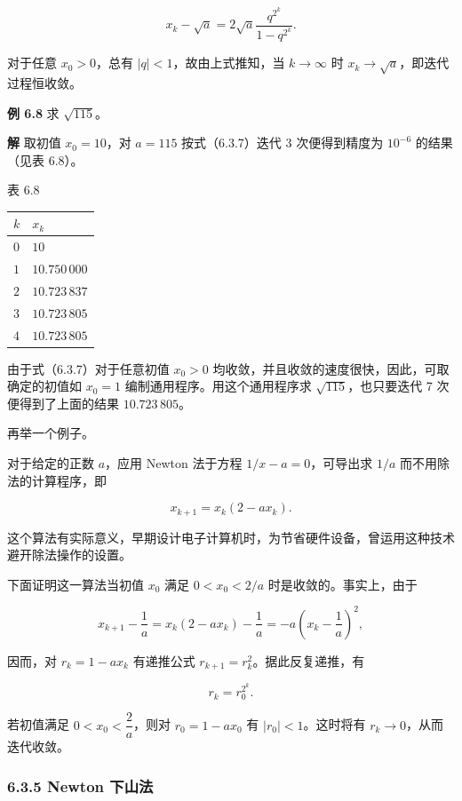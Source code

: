\documentclass[
  10pt,
  fontset=fandol]{ctexart}
\newcounter{none} %
\begin{document}
\[
x_k-\sqrt{a}=2\sqrt{a}\frac{q^{2^k}}{1-q^{2^k}}.
\]

对于任意 \(x_0>0\)，总有 \(|q|<1\)，故由上式推知，当 \(k\to\infty\) 时 \(x_k\to\sqrt{a}\)，即迭代过程恒收敛。

\textbf{例 6.8} 求 \(\sqrt{115}\)。

\textbf{解} 取初值 \(x_0=10\)，对 \(a=115\) 按式（6.3.7）迭代 3 次便得到精度为 \(10^{-6}\) 的结果（见表 6.8）。

表 6.8

{\def\LTcaptype{none} %
\begin{longtable}[]{@{}ll@{}}
\toprule\noalign{}
\(k\) & \(x_k\) \\
\midrule\noalign{}
\endhead
\bottomrule\noalign{}
\endlastfoot
\(0\) & \(10\) \\
\(1\) & \(10.750\,000\) \\
\(2\) & \(10.723\,837\) \\
\(3\) & \(10.723\,805\) \\
\(4\) & \(10.723\,805\) \\
\end{longtable}
}

由于式（6.3.7）对于任意初值 \(x_0>0\) 均收敛，并且收敛的速度很快，因此，可取确定的初值如 \(x_0=1\) 编制通用程序。用这个通用程序求 \(\sqrt{115}\)，也只要迭代 7 次便得到了上面的结果 \(10.723\,805\)。

再举一个例子。

对于给定的正数 \(a\)，应用 Newton 法于方程 \(1/x-a=0\)，可导出求 \(1/a\) 而不用除法的计算程序，即

\[
x_{k+1}=x_k(2-ax_k).
\]

这个算法有实际意义，早期设计电子计算机时，为节省硬件设备，曾运用这种技术避开除法操作的设置。

下面证明这一算法当初值 \(x_0\) 满足 \(0<x_0<2/a\) 时是收敛的。事实上，由于

\[
x_{k+1}-\frac{1}{a}=x_k(2-ax_k)-\frac{1}{a}=-a\left(x_k-\frac{1}{a}\right)^2,
\]

因而，对 \(r_k=1-ax_k\) 有递推公式 \(r_{k+1}=r_k^2\)。据此反复递推，有

\[
r_k=r_0^{2^k}.
\]

若初值满足 \(0<x_0<\dfrac{2}{a}\)，则对 \(r_0=1-ax_0\) 有 \(|r_0|<1\)。这时将有 \(r_k\to0\)，从而迭代收敛。

\subsubsection{6.3.5 Newton 下山法}\label{newton-ux4e0bux5c71ux6cd5}
\end{document}
